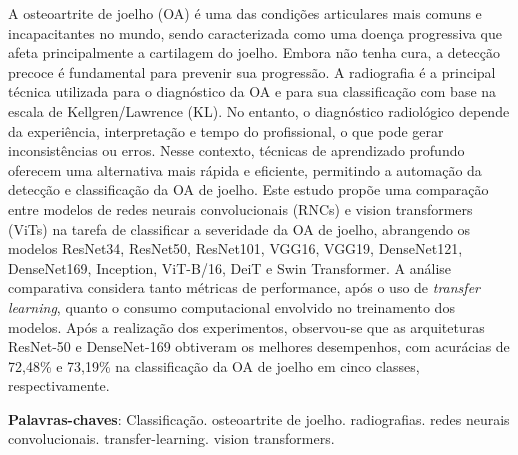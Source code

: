 
\setlength{\absparsep}{18pt} %
\begin{resumo}
A osteoartrite de joelho (OA) é uma das condições articulares mais comuns e incapacitantes no mundo, sendo caracterizada como uma doença progressiva que afeta principalmente a cartilagem do joelho. Embora não tenha cura, a detecção precoce é fundamental para prevenir sua progressão. A radiografia é a principal técnica utilizada para o diagnóstico da OA e para sua classificação com base na escala de Kellgren/Lawrence (KL). No entanto, o diagnóstico radiológico depende da experiência, interpretação e tempo do profissional, o que pode gerar inconsistências ou erros. Nesse contexto, técnicas de aprendizado profundo oferecem uma alternativa mais rápida e eficiente, permitindo a automação da detecção e classificação da OA de joelho. Este estudo propõe uma comparação entre modelos de redes neurais convolucionais (RNCs) e vision transformers (ViTs) na tarefa de classificar a severidade da OA de joelho, abrangendo os modelos ResNet34, ResNet50, ResNet101, VGG16, VGG19, DenseNet121, DenseNet169, Inception, ViT-B/16, DeiT e Swin Transformer. A análise comparativa considera tanto métricas de performance, após o uso de \textit{transfer learning}, quanto o consumo computacional envolvido no treinamento dos modelos. Após a realização dos experimentos, observou-se que as arquiteturas ResNet-50 e DenseNet-169 obtiveram os melhores desempenhos, com acurácias de 72,48\% e 73,19\% na classificação da OA de joelho em cinco classes, respectivamente.

 \textbf{Palavras-chaves}: Classificação. osteoartrite de joelho. radiografias. redes neurais convolucionais. transfer-learning. vision transformers.
\end{resumo}

